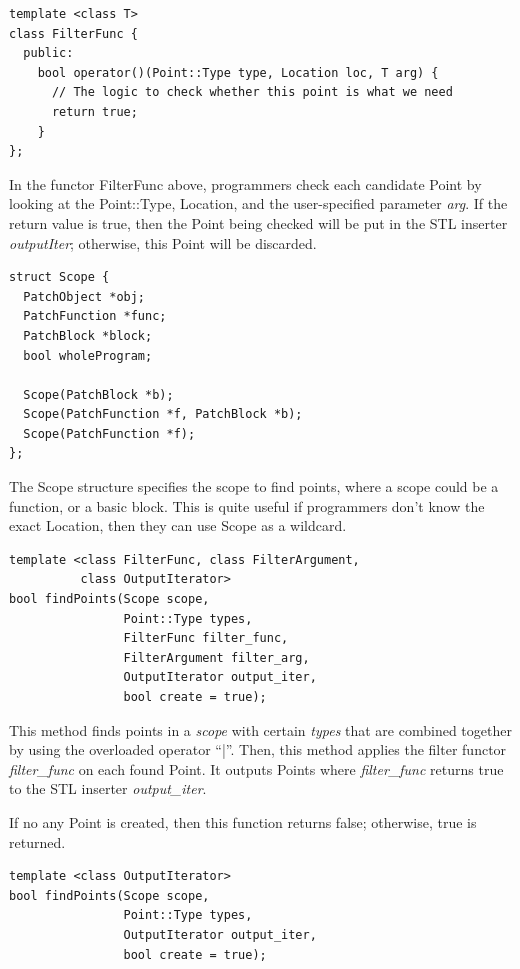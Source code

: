 \documentclass[11pt]{article}
\begin{document}
\begin{verbatim}
template <class T>
class FilterFunc {
  public:
    bool operator()(Point::Type type, Location loc, T arg) {
      // The logic to check whether this point is what we need
      return true;
    }
};

\end{verbatim}



In the functor FilterFunc above, programmers check each candidate Point by
looking at the Point::Type, Location, and the user-specified parameter \emph{arg}.
If the return value is true, then the Point being checked will be put in the STL
inserter \emph{outputIter}; otherwise, this Point will be discarded.


\begin{verbatim}
struct Scope {
  PatchObject *obj;
  PatchFunction *func;
  PatchBlock *block;
  bool wholeProgram;

  Scope(PatchBlock *b);
  Scope(PatchFunction *f, PatchBlock *b);
  Scope(PatchFunction *f);
};

\end{verbatim}



The Scope structure specifies the scope to find points, where a scope could be
a function, or a basic block. This is quite useful if programmers don't know the
exact Location, then they can use Scope as a wildcard.


\begin{verbatim}
template <class FilterFunc, class FilterArgument,
          class OutputIterator>
bool findPoints(Scope scope,
                Point::Type types,
                FilterFunc filter_func,
                FilterArgument filter_arg,
                OutputIterator output_iter,
                bool create = true);

\end{verbatim}



This method finds points in a \emph{scope} with certain \emph{types} that are combined
together by using the overloaded operator ``|''. Then, this method applies the
filter functor \emph{filter\_func} on each found Point. It outputs Points where
\emph{filter\_func} returns true to the STL inserter \emph{output\_iter}.

If no any Point is created, then this function returns false; otherwise, true is
returned.



\begin{verbatim}
template <class OutputIterator>
bool findPoints(Scope scope,
                Point::Type types,
                OutputIterator output_iter,
                bool create = true);

\end{verbatim}
\end{document}
